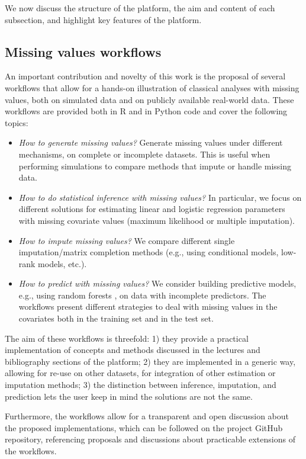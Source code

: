 We now discuss the structure of the  platform, the aim and content of each subsection, and highlight key features of the platform.

\subsection{Missing values workflows}

An important contribution and novelty of this work is the proposal of several workflows that allow for a hands-on illustration of classical analyses with missing values, both on simulated data and on publicly available real-world data. These workflows are provided both in {R} and in {Python} code and cover the following topics:
\begin{itemize}
\item \textit{How to generate missing values?} Generate missing values under
different mechanisms, on complete or incomplete datasets. This is useful when performing simulations
to compare methods that impute or handle missing data.
\item \textit{How to do statistical inference with missing values?} In particular, we focus on different solutions for estimating
linear and logistic regression parameters with missing covariate values (maximum likelihood or multiple imputation).
\item \textit{How to impute missing values?} We compare different single imputation/matrix completion methods (e.g., using conditional models, low-rank models, etc.).
\item \textit{How to predict with missing values?} We consider building predictive models, e.g., using random forests \citep{breiman_2001}, on data with incomplete predictors. The workflows present different strategies to deal with missing values in the covariates both in the training set and in the test set.
\end{itemize}

The aim of these workflows is threefold: 1) they provide a practical
implementation of concepts and methods discussed in the lectures and
bibliography sections of the platform; 2) they are implemented in a generic way,
allowing for re-use on other datasets, for integration of other
estimation or imputation methods; 3) the distinction between inference, imputation, and prediction lets the user keep in mind the solutions are not the same.


Furthermore, the workflows allow for a transparent and open discussion about the proposed implementations, which can be followed on the project GitHub repository, referencing proposals and discussions about practicable extensions of the workflows.

